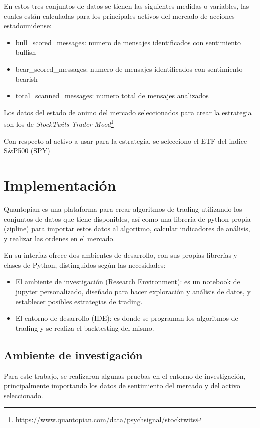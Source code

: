 \documentclass[a4paper, 11pt, twocolumn]{article}
\begin{document}
En estos tres conjuntos de datos se tienen las siguientes medidas o variables, las cuales están calculadas para los principales activos del mercado de acciones estadounidense:

\begin{itemize}
    \item bull\_scored\_messages: numero de mensajes identificados con sentimiento bullish
    \item bear\_scored\_messages: numero de mensajes identificados con sentimiento bearish
    \item total\_scanned\_messages: numero total de mensajes analizados
\end{itemize}

Los datos del estado de animo del mercado seleccionados para crear la estrategia son los de \textit{StockTwits Trader Mood}\footnote{https://www.quantopian.com/data/psychsignal/stocktwits}

Con respecto al activo a usar para la estrategia, se selecciono el ETF del indice S\&P500 (SPY)

\section{Implementación}
Quantopian es una plataforma para crear algoritmos de trading utilizando los conjuntos de datos que tiene disponibles, así como una librería de python propia (zipline) para importar estos datos al algoritmo, calcular indicadores de análisis, y realizar las ordenes en el mercado.

En su interfaz ofrece dos ambientes de desarrollo, con sus propias librerías y clases de Python, distinguidos según las necesidades:
\begin{itemize}
    \item El ambiente de investigación (Research Environment): es un notebook de jupyter personalizado, diseñado para hacer exploración y análisis de datos, y establecer posibles estrategias de trading.
    \item El entorno de desarrollo (IDE): es donde se programan los algoritmos de trading y se realiza el backtesting del mismo.
\end{itemize}

\subsection{Ambiente de investigación}

Para este trabajo, se realizaron algunas pruebas en el entorno de investigación, principalmente importando los datos de sentimiento del mercado y del activo seleccionado.
\end{document}
